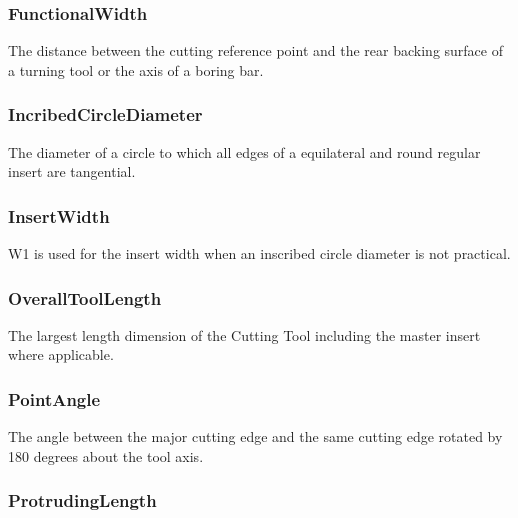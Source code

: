 \subsubsection{FunctionalWidth}
\label{sec:FunctionalWidth}



The distance between the cutting reference point and the rear backing surface of a turning tool or the axis of a boring bar.



\subsubsection{IncribedCircleDiameter}
\label{sec:IncribedCircleDiameter}



The diameter of a circle to which all edges of a equilateral and round regular insert are tangential.



\subsubsection{InsertWidth}
\label{sec:InsertWidth}



W1 is used for the insert width when an inscribed circle diameter is not practical.



\subsubsection{OverallToolLength}
\label{sec:OverallToolLength}



The largest length dimension of the Cutting Tool including the master insert where applicable.



\subsubsection{PointAngle}
\label{sec:PointAngle}



The angle between the major cutting edge and the same cutting edge rotated by 180 degrees about the tool axis.



\subsubsection{ProtrudingLength}
\label{sec:ProtrudingLength}



